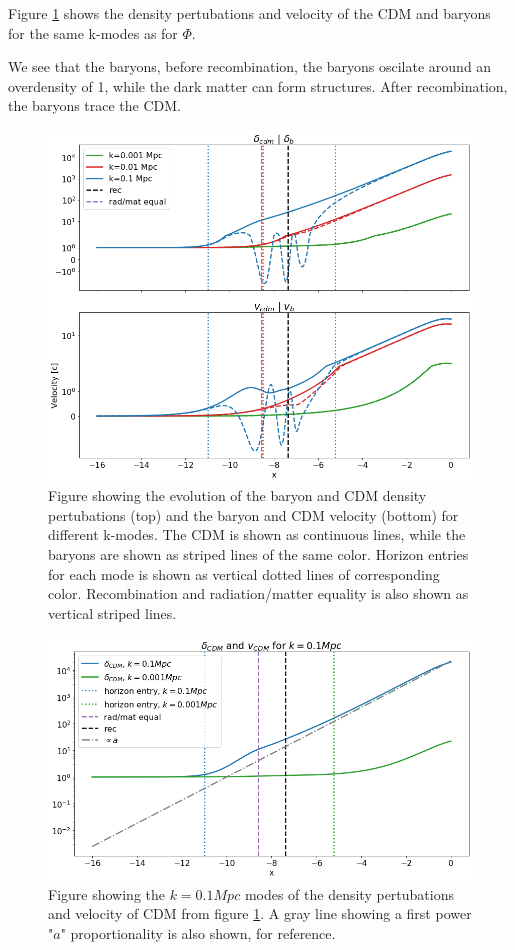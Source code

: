 \documentclass[10pt, a4paper]{article}
\begin{document}
Figure \ref{fig:delta_and_v} shows the density pertubations and velocity of the CDM and baryons for the same k-modes as for $\Phi$. 

We see that the baryons, before recombination, the baryons oscilate around an overdensity of 1, while the dark matter can form structures. After recombination, the baryons trace the CDM.

\begin{figure}[H]
    \centering
    \includegraphics[scale=0.45]{../m3_figs/delta_and_v.png}
    \caption{Figure showing the evolution of the baryon and CDM density pertubations (top) and the baryon and CDM velocity (bottom) for different k-modes. The CDM is shown as continuous lines, while the baryons are shown as striped lines of the same color. Horizon entries for each mode is shown as vertical dotted lines of corresponding color. Recombination and radiation/matter equality is also shown as vertical striped lines.}
    \label{fig:delta_and_v}
\end{figure}

\begin{figure}[H]
    \centering
    \includegraphics[scale=0.45]{../m3_figs/delta_and_v_zoomed.png}
    \caption{Figure showing the $k=0.1 Mpc$ modes of the density pertubations and velocity of CDM from figure \ref{fig:delta_and_v}. A gray line showing a first power "$a$" proportionality is also shown, for reference.}
    \label{}
\end{figure}
\end{document}
